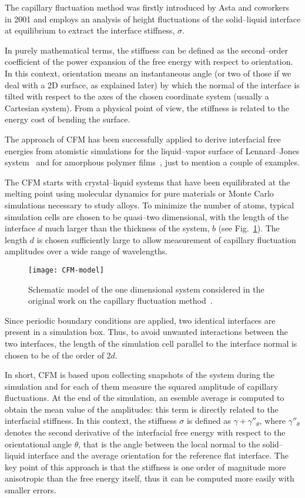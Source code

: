The capillary fluctuation method was firstly introduced by Asta and coworkers~\cite{HoytPRL2001:CFM} in 2001 and employs an analysis of height fluctuations
of the solid--liquid interface at equilibrium to extract the interface stiffness, $\sigma$.

In purely mathematical terms, the stiffness can be defined as the second--order coefficient of the power expansion of the free energy with respect to orientation. In this context, orientation means an instantaneous angle (or two of those if we deal with a 2D surface, as explained later) by which the normal of the interface is tilted with respect to the axes of the chosen coordinate system (usually a Cartesian system). From a physical point of view, the stiffness is related to the energy cost of bending the surface.

The approach of CFM has been successfully applied to derive interfacial free energies from atomistic simulations for the liquid--vapor surface of Lennard--Jones system~\cite{Sides1999:HoytREVIEW43} and for amorphous polymer films~\cite{Hapke1998:HoytREVIEW44}, just to mention a couple of examples.

The CFM starts with crystal–liquid systems that have been equilibrated at the melting point
using molecular dynamics for pure materials or Monte Carlo simulations necessary to study alloys. To minimize the number of atoms, typical simulation cells are chosen to be quasi--two dimensional, with the length of the interface $d$ much larger than the thickness of the system, $b$ (see Fig.~\ref{fig:CFM_model}). The length $d$ is chosen sufficiently large to allow measurement of capillary fluctuation amplitudes over a wide range of wavelengths.
\begin{figure}[bt]
    \centering
    \texttt{[image: CFM-model]}
    \caption{Schematic model of the one dimensional system considered in the original work on the capillary fluctuation method~\cite{Hoyt2003CFMReview}.}
    \label{fig:CFM_model}
\end{figure}

Since periodic boundary conditions are applied, two identical interfaces are present in a simulation box. Thus, to avoid unwanted interactions between the two interfaces, the length of the simulation cell parallel to the interface normal is chosen to be of the order of $2d$.

In short, CFM is based upon collecting snapshots of the system during the simulation and for each of them measure the squared amplitude of capillary fluctuations. At the end of the simulation, an esemble average is computed to obtain the mean value of the amplitudes: this term is directly related to the interfacial stiffness. In this context, the stiffness $\sigma$ is defined as $\gamma + \gamma''_{\theta}$, where $\gamma''_{\theta}$ denotes the second derivative of the interfacial free energy with respect to the orientational angle $\theta$, that is the angle between the local normal to the solid--liquid interface and the average orientation for the reference flat interface. The key point of this approach is that the stiffness is one order of magnitude more anisotropic than the free energy itself, thus it can be computed more easily with smaller errors.

